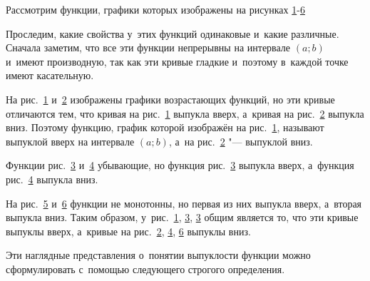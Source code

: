 
Рассмотрим функции, графики которых изображены на рисунках \ref{fig:5_6_5}-\ref{fig:5_6_10}

\begin{figure}\label{fig:5_6_5}
\end{figure}

\begin{figure}\label{fig:5_6_6}
\end{figure}

\begin{figure}\label{fig:5_6_7}
\end{figure}

\begin{figure}\label{fig:5_6_8}
\end{figure}

\begin{figure}\label{fig:5_6_9}
\end{figure}

\begin{figure}\label{fig:5_6_10}
\end{figure}

Проследим, какие свойства у~этих функций одинаковые и~какие различные.
Сначала заметим, что все эти функции непрерывны на интервале $(a; b)$ и~имеют производную,
так как эти кривые гладкие и~поэтому в~каждой точке имеют касательную.

На рис.\ \ref{fig:5_6_5} и~\ref{fig:5_6_6} изображены графики возрастающих функций,
но эти кривые отличаются тем, что кривая на рис.\ \ref{fig:5_6_5} выпукла вверх,
а~кривая на рис.\ \ref{fig:5_6_6} выпукла вниз. Поэтому функцию, график которой
изображён на рис.\ \ref{fig:5_6_5}, называют выпуклой вверх на интервале $(a; b)$,
а~на рис.\ \ref{fig:5_6_6} "--- выпуклой вниз.

Функции рис.\ \ref{fig:5_6_7} и~\ref{fig:5_6_8} убывающие,
но функция рис.\ \ref{fig:5_6_7} выпукла вверх, а~функция рис.\ \ref{fig:5_6_8} выпукла вниз.

На рис.\ \ref{fig:5_6_9} и~\ref{fig:5_6_10} функции не монотонны, но первая из них
выпукла вверх, а~вторая выпукла вниз.
Таким образом, у~рис.\ \ref{fig:5_6_5}, \ref{fig:5_6_7}, \ref{fig:5_6_7} общим
является то, что эти кривые выпуклы вверх,
а~кривые на рис.\ \ref{fig:5_6_6}, \ref{fig:5_6_8}, \ref{fig:5_6_10} выпуклы вниз.

Эти наглядные представления о~понятии выпуклости функции можно сформулировать
с~помощью следующего строгого определения.

